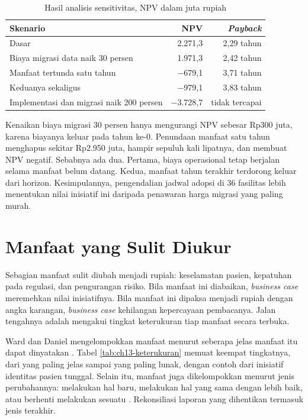 \begin{pendalaman}[title={Pendalaman Teknis (opsional): Analisis Sensitivitas}]
\begin{table}[H]
  \centering
  \caption{Hasil analisis sensitivitas, NPV dalam juta rupiah}
  \label{tab:ch13-sensitivitas}
  \footnotesize
  \begin{tabularx}{\linewidth}{Xrr}
    \hline
    \textbf{Skenario} & \textbf{NPV} & \textbf{\textit{Payback}} \\
    \hline
    Dasar & 2.271,3 & 2,29 tahun \\
    \hline
    Biaya migrasi data naik 30 persen & 1.971,3 & 2,42 tahun \\
    \hline
    Manfaat tertunda satu tahun & $-$679,1 & 3,71 tahun \\
    \hline
    Keduanya sekaligus & $-$979,1 & 3,83 tahun \\
    \hline
    Implementasi dan migrasi naik 200 persen & $-$3.728,7 & tidak tercapai \\
    \hline
  \end{tabularx}
\end{table}

Kenaikan biaya migrasi 30 persen hanya mengurangi NPV sebesar Rp300 juta,
karena biayanya keluar pada tahun ke-0. Penundaan manfaat satu tahun
menghapus sekitar Rp2.950 juta, hampir sepuluh kali lipatnya, dan membuat NPV
negatif. Sebabnya ada dua. Pertama, biaya operasional tetap berjalan selama
manfaat belum datang. Kedua, manfaat tahun terakhir terdorong keluar dari
horizon. Kesimpulannya, pengendalian jadwal adopsi di 36 fasilitas lebih
menentukan nilai inisiatif ini daripada penawaran harga migrasi yang paling
murah.
\end{pendalaman}

\section{Manfaat yang Sulit Diukur}

Sebagian manfaat sulit diubah menjadi rupiah: keselamatan pasien, kepatuhan
pada regulasi, dan pengurangan risiko. Bila manfaat ini diabaikan,
\textit{business case} meremehkan nilai inisiatifnya. Bila manfaat ini
dipaksa menjadi rupiah dengan angka karangan, \textit{business case}
kehilangan kepercayaan pembacanya. Jalan tengahnya adalah mengakui tingkat
keterukuran tiap manfaat secara terbuka.

Ward dan Daniel mengelompokkan manfaat menurut seberapa jelas manfaat itu
dapat dinyatakan \cite{ward2012}. Tabel \ref{tab:ch13-keterukuran} memuat
keempat tingkatnya, dari yang paling jelas sampai yang paling lunak, dengan
contoh dari inisiatif identitas pasien tunggal. Selain itu, manfaat juga
dikelompokkan menurut jenis perubahannya: melakukan hal baru, melakukan hal
yang sama dengan lebih baik, atau berhenti melakukan sesuatu
\cite{ward2012}. Rekonsiliasi laporan yang dihentikan termasuk jenis
terakhir.


